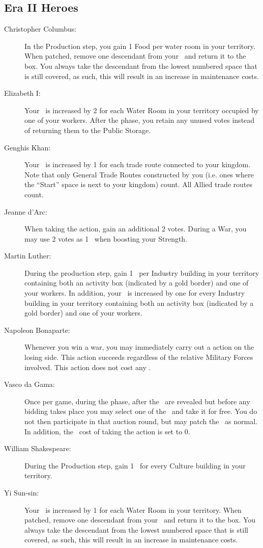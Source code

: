 \documentclass[10pt,twocolumn]{article}
\begin{document}
\begin{appendices}
\subsection{Era II Heroes}
\begin{description}
\item[Christopher Columbus:] In the Production step, you gain 1 Food per water room in your territory. When patched, remove one descendant from your \psb\ and return it to the box. You always take the descendant from the lowest numbered space that is still covered, as such, this will result in an increase in maintenance costs.
\item[Elizabeth I:] Your \mil\ is increased by 2 for each Water Room in your territory occupied by one of your workers. After the  phase, you retain any unused votes instead of returning them to the Public Storage.
\item[Genghis Khan:] Your \mil\ is increased by 1 for each trade route connected to your kingdom. Note that only General Trade Routes constructed by you (i.e. ones where the ``Start'' space is next to your kingdom) count. All Allied trade routes count.
\item[Jeanne d'Arc:] When taking the  action, gain an additional 2 votes. During a War, you may use 2 votes as 1 \mineral\ when boosting your Strength.
\item[Martin Luther:] During the production step, gain 1 \vp\ per Industry building in your territory containing both an activity box (indicated by a gold border) and one of your workers. In addition, your \mil\ is increased by one for every Industry building in your territory containing both an activity box (indicated by a gold border) and one of your workers.
\item[Napoleon Bonaparte:] Whenever you win a war, you may immediately carry out a  action on the losing side. This action succeeds regardless of the relative Military Forces involved. This action does not cost any \polfs.
\item[Vasco da Gama:] Once per game, during the  phase, after the \landcards\ are revealed but before any bidding takes place you may select one of the \landcards\ and take it for free. You do not then participate in that auction round, but may patch the \landcard\ as normal. In addition, the \polfs\ cost of taking the  action is set to 0.
\item[William Shakespeare:] During the Production step, gain 1 \money\ for every Culture building in your territory.
\item[Yi Sun-sin:] Your \mil\ is increased by 1 for each Water Room in your territory. When patched, remove one descendant from your \psb\ and return it to the box. You always take the descendant from the lowest numbered space that is still covered, as such, this will result in an increase in maintenance costs.
\end{description}

\end{appendices}
\end{document}
